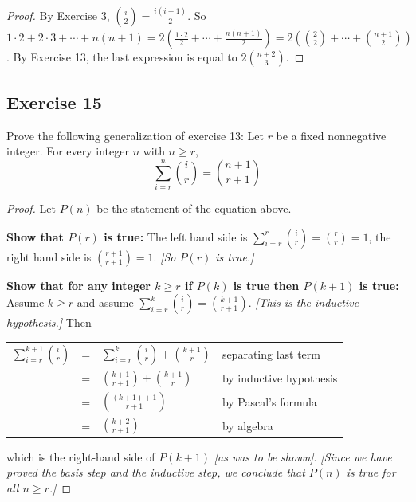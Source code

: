 \documentclass[14pt]{extarticle}
\newcommand{\dps}{\displaystyle}
\newcommand{\cy}{\color{cyan}}
\begin{document}
\begin{proof}
     By Exercise 3, \(\binom{i}{2} = \frac{i(i-1)}{2}\).
     So \(1 \cdot 2 + 2 \cdot 3 + \cdots + n(n + 1) = 2 \left( \frac{1 \cdot 2}{2} + \cdots + \frac{n(n+1)}{2}\right) =
     2\left(\binom{2}{2} + \cdots + \binom{n+1}{2}\right)\).
     By Exercise 13, the last expression is equal to \(2 \binom{n+2}{3}\).
\end{proof}

\subsection{Exercise 15}
Prove the following generalization of exercise 13: Let \(r\) be a fixed nonnegative integer. For every integer \(n\) with
\(n \geq r\),
\[
     \sum_{i=r}^{n}\binom{i}{r} = \binom{n+1}{r+1}
\]
\begin{proof}
     Let \(P(n)\) be the statement of the equation above.

          {\bf Show that \(P(r)\) is true:} The left hand side is
     \(\sum_{i=r}^r \binom{i}{r} = \binom{r}{r} = 1\), the right
     hand side is \(\binom{r+1}{r+1} = 1\). {\it [So \(P(r)\) is true.]}

          {\bf Show that for any integer \(k \geq r\) if \(P(k)\) is true then \(P(k+1)\) is true:} Assume \(k \geq r\) and assume
     \(\sum_{i=r}^{k}\binom{i}{r} = \binom{k+1}{r+1}\). {\it [This is the inductive hypothesis.]} Then
     \begin{center}
          \begin{tabular}{rcll}
               \(\dps \sum_{i=r}^{k+1} \binom{i}{r}\) & = & \(\dps \sum_{i=r}^{k} \binom{i}{r} + \binom{k+1}{r}\) & {\cy separating last
               term}                                                                                                                              \\
                                                      & = & \(\dps \binom{k+1}{r+1} + \binom{k+1}{r}\)            & {\cy by inductive hypothesis} \\
                                                      & = & \(\dps \binom{(k+1)+1}{r+1}\)                         & {\cy by Pascal's formula}     \\
                                                      & = & \(\dps \binom{k+2}{r+1}\)                             & {\cy by algebra}
          \end{tabular}
     \end{center}
     which is the right-hand side of \(P(k + 1)\) {\it [as was to be shown]}. {\it [Since we have proved the basis step and the
          inductive step, we conclude that \(P(n)\) is true for all \(n \geq r\).]}
\end{proof}
\end{document}
